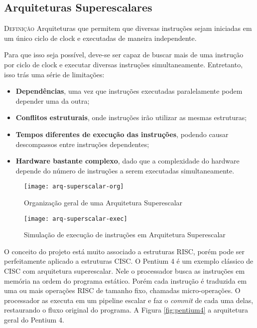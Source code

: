 \subsection{Arquiteturas Superescalares}
\textsc{Definição} Arquiteturas que permitem que diversas instruções sejam iniciadas em um único ciclo de clock e executadas de maneira independente.

Para que isso seja possível, deve-se ser capaz de buscar mais de uma instrução
por ciclo de clock e executar diversas instruções simultaneamente. Entretanto, isso trás uma série de limitações:
\begin{itemize}
  \item \textbf{Dependências}, uma vez que instruções executadas paralelamente podem depender uma da outra;

  \item \textbf{Conflitos estruturais}, onde instruções irão utilizar as mesmas estruturas;

  \item \textbf{Tempos diferentes de execução das instruções}, podendo causar descompassos entre instruções dependentes;

  \item \textbf{Hardware bastante complexo}, dado que a complexidade do hardware depende do número de instruções a serem executadas simultaneamente.
\end{itemize}

\begin{figure}[ht]
  \centering
  \texttt{[image: arq-superscalar-org]}
  \caption{Organização geral de uma Arquitetura Superescalar}
  \label{fig:arq-superscalar-org}
\end{figure}

\begin{figure}[ht]
  \centering
  \texttt{[image: arq-superscalar-exec]}
  \caption{Simulação de execução de instruções em Arquitetura Superescalar}
  \label{fig:arq-superscalar-exec}
\end{figure}

O conceito do projeto está muito associado a estruturas RISC, porém pode ser perfeitamente aplicado a estruturas CISC. O Pentium 4 é um exemplo clássico de CISC com arquitetura superescalar. Nele o processador busca as instruções em memória na ordem do programa estático. Porém cada instrução é traduzida em uma ou mais operações RISC de tamanho fixo, chamadas micro-operações. O processador as executa em um pipeline escalar e faz o \textit{commit} de cada uma delas, restaurando o fluxo original do programa. A Figura \ref{fig:pentium4} a arquitetura geral do Pentium 4.

